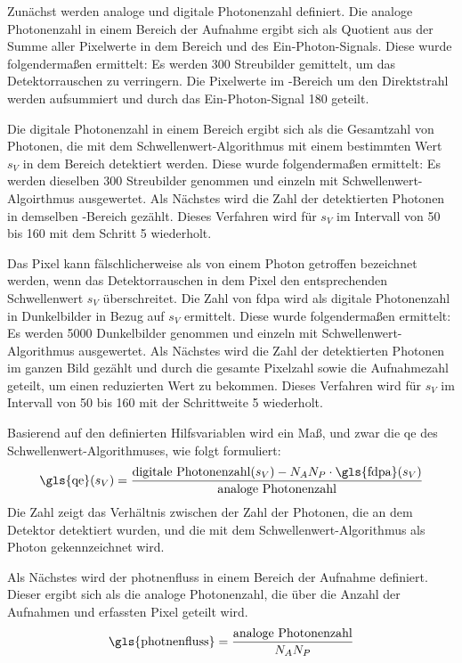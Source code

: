 \noindent
Zunächst werden analoge und digitale Photonenzahl definiert. Die analoge Photonenzahl in einem Bereich der Aufnahme ergibt sich als Quotient aus der Summe aller Pixelwerte in dem Bereich und des Ein-Photon-Signals. Diese wurde folgendermaßen ermittelt: Es werden 300 Streubilder gemittelt, um das Detektorrauschen zu verringern. Die Pixelwerte im -Bereich um den Direktstrahl werden aufsummiert und durch das Ein-Photon-Signal \SI{180}{\adu} geteilt.

\noindent
Die digitale Photonenzahl in einem Bereich ergibt sich als die Gesamtzahl von Photonen, die mit dem Schwellenwert-Algorithmus mit einem bestimmten Wert $s_V$ in dem Bereich detektiert werden. Diese wurde folgendermaßen ermittelt: Es werden dieselben 300 Streubilder genommen und einzeln mit Schwellenwert-Algoirthmus ausgewertet. Als Nächstes wird die Zahl der detektierten Photonen in demselben -Bereich gezählt. Dieses Verfahren wird für $s_V$ im Intervall von \SI{50}{\adu} bis \SI{160}{\adu} mit dem Schritt \SI{5}{\adu} wiederholt.

\noindent
Das Pixel kann fälschlicherweise als von einem Photon getroffen bezeichnet werden, wenn das Detektorrauschen in dem Pixel den entsprechenden Schwellenwert $s_V$ überschreitet. Die Zahl von \gls{fdpa} wird als digitale Photonenzahl in Dunkelbilder in Bezug auf $s_V$ ermittelt. Diese wurde folgendermaßen ermittelt: Es werden 5000 Dunkelbilder genommen und einzeln mit Schwellenwert-Algorithmus ausgewertet. Als Nächstes wird die Zahl der detektierten Photonen im ganzen Bild gezählt und durch die gesamte Pixelzahl  sowie die Aufnahmezahl geteilt, um einen reduzierten Wert zu bekommen. Dieses Verfahren wird für $s_V$ im Intervall von \SI{50}{\adu} bis \SI{160}{\adu} mit der Schrittweite \SI{5}{\adu} wiederholt.

\noindent
Basierend auf den definierten Hilfsvariablen wird ein Maß, und zwar die \gls{qe} des Schwellenwert-Algorithmuses, wie folgt formuliert:
\begin{equation}
    \text{\gls{qe}}(s_V) = \frac{\text{digitale Photonenzahl}(s_V) - N_A N_P \cdot \text{\gls{fdpa}}(s_V)}{\text{analoge Photonenzahl}}
\end{equation}
Die Zahl zeigt das Verhältnis zwischen der Zahl der Photonen, die an dem Detektor detektiert wurden, und die mit dem Schwellenwert-Algorithmus als Photon gekennzeichnet wird.

\noindent
Als Nächstes wird der \gls{photnenfluss} in einem Bereich der Aufnahme definiert. Dieser ergibt sich als die analoge Photonenzahl, die über die Anzahl der Aufnahmen und erfassten Pixel geteilt wird.
\begin{equation}
    \text{\gls{photnenfluss}} = \frac{\text{analoge Photonenzahl}}{N_A N_P}
\end{equation}


